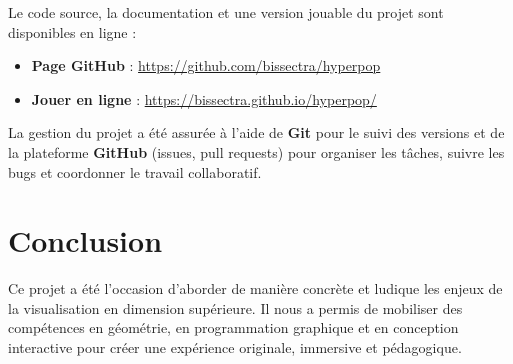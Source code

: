 \documentclass[11pt,a4paper]{article}
\begin{document}
Le code source, la documentation et une version jouable du projet sont disponibles en ligne :
\begin{itemize}
    \item \textbf{Page GitHub} : \url{https://github.com/bissectra/hyperpop}
    \item \textbf{Jouer en ligne} : \url{https://bissectra.github.io/hyperpop/}
\end{itemize}

La gestion du projet a été assurée à l'aide de \textbf{Git} pour le suivi des versions et de la plateforme \textbf{GitHub} (issues, pull requests) pour organiser les tâches, suivre les bugs et coordonner le travail collaboratif.

\section{Conclusion}

Ce projet a été l’occasion d’aborder de manière concrète et ludique les enjeux de la visualisation en dimension supérieure. Il nous a permis de mobiliser des compétences en géométrie, en programmation graphique et en conception interactive pour créer une expérience originale, immersive et pédagogique.
\end{document}
